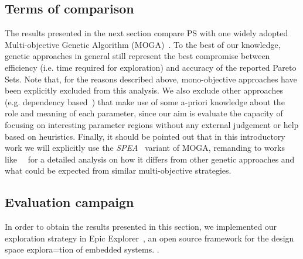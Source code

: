 \begin{table}
\end{table}


\subsection{Terms of comparison}

The results presented in the next section compare PS with one widely
adopted Multi-objective Genetic Algorithm
(MOGA)~\cite{knowles_techrep06}. To the best of our knowledge, genetic
approaches in general still represent the best compromise between
efficiency (i.e. time required for exploration) and accuracy of the
reported Pareto Sets.  Note that, for the reasons described above,
mono-objective approaches have been explicitly excluded from this
analysis.  We also exclude other approaches (e.g.  dependency
based~\cite{givargis_tvlsi02}) that make use of some a-priori
knowledge about the role and meaning of each parameter, since our aim
is evaluate the capacity of focusing on interesting parameter regions
without any external judgement or help based on heuristics.  Finally,
it should be pointed out that in this introductory work we will
explicitly use the \emph{SPEA}~\cite{zitzler_eurogen01} variant of
MOGA, remanding to works like~\cite{zitzler_ec00}~\cite{zitzler_tec03}
for a detailed analysis on how it differs from other genetic approaches
and what could be expected from similar multi-objective strategies.


\subsection{Evaluation campaign}
In order to obtain the results presented in this section, we implemented our exploration strategy in Epic Explorer~\cite{ascia2003epic}, an open source framework for the design space explora=tion of embedded systems. . 

